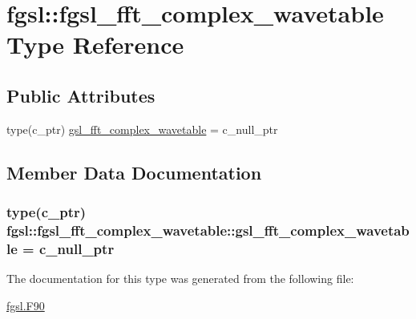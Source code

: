 \hypertarget{structfgsl_1_1fgsl__fft__complex__wavetable}{\section{fgsl\-:\-:fgsl\-\_\-fft\-\_\-complex\-\_\-wavetable Type Reference}
\label{structfgsl_1_1fgsl__fft__complex__wavetable}
}
\subsection*{Public Attributes}
\begin{DoxyCompactItemize}
\item 
type(c\-\_\-ptr) \hyperlink{structfgsl_1_1fgsl__fft__complex__wavetable_afb4fa615365958d5ee789a7702992108}{gsl\-\_\-fft\-\_\-complex\-\_\-wavetable} = c\-\_\-null\-\_\-ptr
\end{DoxyCompactItemize}


\subsection{Member Data Documentation}
\hypertarget{structfgsl_1_1fgsl__fft__complex__wavetable_afb4fa615365958d5ee789a7702992108}{
\subsubsection[{gsl\-\_\-fft\-\_\-complex\-\_\-wavetable}]{\setlength{\rightskip}{0pt plus 5cm}type(c\-\_\-ptr) fgsl\-::fgsl\-\_\-fft\-\_\-complex\-\_\-wavetable\-::gsl\-\_\-fft\-\_\-complex\-\_\-wavetable = c\-\_\-null\-\_\-ptr}}\label{structfgsl_1_1fgsl__fft__complex__wavetable_afb4fa615365958d5ee789a7702992108}


The documentation for this type was generated from the following file\-:\begin{DoxyCompactItemize}
\item 
\hyperlink{fgsl_8F90}{fgsl.\-F90}\end{DoxyCompactItemize}
